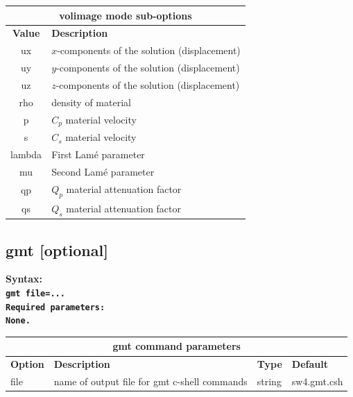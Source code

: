 \documentclass[11pt]{report}
\begin{document}
\begin{center}
\begin{tabular}{|c|l|} \hline
\multicolumn{2}{|c|}{\bf volimage mode sub-options}\\ \hline
\bf{Value} & \bf{Description} \\ \hline  \hline
ux      & $x$-components of the solution (displacement) \\ \hline
uy      & $y$-components of the solution (displacement) \\ \hline
uz      & $z$-components of the solution (displacement) \\ \hline
rho     & density of material \\ \hline
p       & $C_p$ material velocity \\ \hline
s       & $C_s$ material velocity \\ \hline
lambda  & First Lam\'e parameter \\ \hline
mu      & Second Lam\'e parameter \\ \hline
qp      & $Q_p$ material attenuation factor \\ \hline
qs      & $Q_s$ material attenuation factor \\ \hline
\end{tabular}
\end{center}

\subsection{gmt [optional]}
\label{keyword:gmt}
\begin{flushleft}\bf
Syntax:\\
\tt gmt file=...\\
\bf Required parameters:\\
\rm None.
\end{flushleft}
%
\begin{center}
\begin{tabular}{|l|p{8cm}|l|l|} \hline
\multicolumn{4}{|c|}{\bf gmt command parameters}\\ \hline
\bf{Option} & \bf{Description} & \bf{Type} & \bf{Default} \\ \hline \hline
file & name of output file for gmt c-shell commands & string & sw4.gmt.csh  \\ \hline
\end{tabular}
\end{center}
\end{document}
